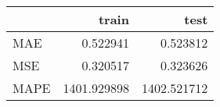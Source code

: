 \begin{tabular}{lrr}
\toprule
{} &        train &         test \\
\midrule
MAE  &     0.522941 &     0.523812 \\
MSE  &     0.320517 &     0.323626 \\
MAPE &  1401.929898 &  1402.521712 \\
\bottomrule
\end{tabular}
